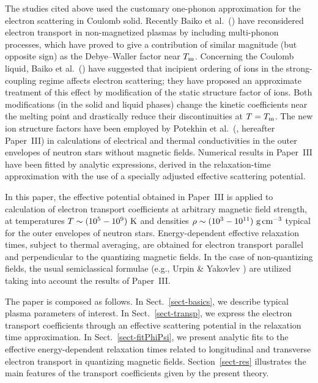 \documentclass{aa}
\newcommand{\gcc}{\mbox{~g\,cm$^{-3}$}}
\begin{document}
The studies cited above
used the customary one-phonon approximation
for the electron scattering in Coulomb solid.
Recently Baiko et al.\ (\cite{baiko-ea98}) have
reconsidered electron transport in non-magnetized plasmas
by including multi-phonon
processes, which have proved to give a contribution of similar magnitude
(but opposite sign) as the Debye--Waller factor near $T_{\rm m}$.
Concerning the Coulomb liquid, Baiko et al.\ (\cite{baiko-ea98}) have
suggested that incipient ordering of ions
in the strong-coupling regime
affects electron scattering; they have proposed
an approximate treatment of this effect by
modification of the static structure factor of ions.
Both modifications (in the solid and liquid phases)
change the kinetic coefficients near the melting point
and drastically reduce their discontinuities at $T=T_{\rm m}$.
The new ion structure factors have been employed by
Potekhin et al.\ (\cite{pbhy99}, hereafter Paper~III)
in calculations of electrical and thermal conductivities
in the outer envelopes of neutron stars without magnetic fields.
Numerical results in Paper~III have been
fitted by analytic expressions,
derived in the relaxation-time approximation
with the use of a specially adjusted
effective scattering potential.

In this paper, the effective potential obtained in Paper~III
is applied
to calculation of electron transport coefficients at arbitrary
magnetic field strength, at temperatures
$T\sim(10^5-10^9){\rm~K}$ and densities
$\rho\sim(10^3-10^{11})\gcc$
typical for the outer envelopes of neutron stars.
Energy-dependent effective relaxation times,
subject to thermal averaging, are obtained
for electron transport parallel and perpendicular
to the quantizing magnetic fields.
In the case of non-quantizing fields, the usual
semiclassical formulae
(e.g., Urpin \& Yakovlev \cite{uy80'}) are utilized
taking into account the results of Paper~III.

The paper is composed as follows.
In Sect.~\ref{sect-basics},
we describe typical
plasma parameters of interest.
In Sect.~\ref{sect-transp},
we express the electron transport coefficients
through an effective scattering potential
in the relaxation time approximation.
In Sect.~\ref{sect-fitPhiPsi},
we present analytic fits to
the effective energy-dependent relaxation times
related to longitudinal and transverse electron transport
in quantizing magnetic fields.
Section~\ref{sect-res} illustrates
the main features of the transport coefficients
given by the present theory.

\end{document}

